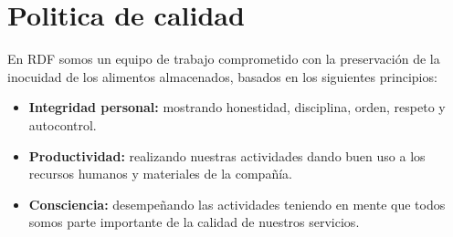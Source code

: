 \thispagestyle{formato-PI}
\renewcommand{\MayorVer}{2}
\renewcommand{\MenorVer}{0}
\renewcommand{\Titulo}{Politica de calidad}
\renewcommand{\Codigo}{BPD-1-POL}
\renewcommand{\FechaPub}{2023--01}

\section{\Titulo}

En \gls{RDF} somos un equipo de trabajo comprometido con la preservación de la inocuidad de los alimentos almacenados, basados en los siguientes principios:

\begin{itemize}
	\item \textbf{Integridad personal:} mostrando honestidad, disciplina, orden, respeto y autocontrol.
	\item \textbf{Productividad:} realizando nuestras actividades dando buen uso a los recursos humanos y materiales de la compañía.
	\item \textbf{Consciencia:} desempeñando las actividades teniendo en mente que todos somos parte importante de la calidad de nuestros servicios.
\end{itemize}